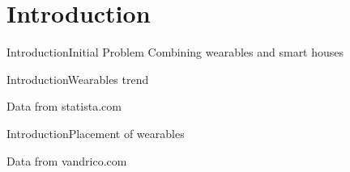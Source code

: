\section{Introduction}

\begin{frame}{Introduction}{Initial Problem}
\centering
Combining wearables and smart houses
\begin{figure}
\end{figure}
\end{frame}

\begin{frame}{Introduction}{Wearables trend}
\centering
\begin{figure}
  \scalebox{0.8}{}
\end{figure}
{\tiny Data from statista.com}
\end{frame}

\begin{frame}{Introduction}{Placement of wearables}
\centering
\begin{figure}
  \scalebox{0.8}{}
\end{figure}
{\tiny Data from vandrico.com}
\end{frame}


